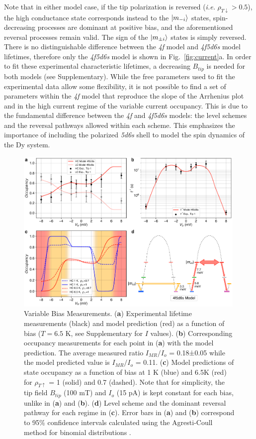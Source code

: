 \documentclass[
reprint,amsmath,amssymb,aps]{revtex4-2}
\begin{document}
Note that in either model case, if the tip polarization is reversed (\textit{i.e.} $\rho_{T \downarrow} > 0.5$), the high conductance state corresponds instead to the $\ket{m_{-i}}$ states, spin-decreasing processes are dominant at positive bias, and the aforementioned reversal processes remain valid. The sign of the $\ket{m_{\pm i}}$ states is simply reversed. There is no distinguishable difference between the \textit{4f} model and \textit{4f5d6s} model lifetimes, therefore only the \textit{4f5d6s} model is shown in Fig.~\ref{fig:current}a. In order to fit these experimental characteristic lifetimes, a decreasing $B_{tip}$ is needed for both models (see Supplementary). While the free parameters used to fit the experimental data allow some flexibility, it is not possible to find a set of parameters within the \textit{4f} model that reproduce the slope of the Arrhenius plot and in the high current regime of the variable current occupancy. This is due to the fundamental difference between the \textit{4f} and \textit{4f5d6s} models: the level schemes and the reversal pathways allowed within each scheme. This emphasizes the importance of including the polarized \textit{5d6s} shell to model the spin dynamics of the Dy system.

\begin{figure}[ht!]
\includegraphics[width=0.99\textwidth]{Fig4_new.pdf}
\caption{Variable Bias Measurements. (\textbf{a}) Experimental lifetime measurements (black) and model prediction (red) as a function of bias ($T = 6.5$ K, see Supplementary for $I$ values). (\textbf{b}) Corresponding occupancy measurements for each point in (\textbf{a}) with the model prediction. The average measured ratio $I_{MR}/I_{o}$ = 0.18±0.05 while the model predicted value is $I_{MR}/I_{o}$ = 0.11. (\textbf{c}) Model predictions of state occupancy as a function of bias at 1 K (blue) and 6.5K (red) for $\rho_{T \uparrow}$ = 1 (solid) and 0.7 (dashed). Note that for simplicity, the tip field $B_{tip}$ (100 mT) and $I_o$ (15 pA) is kept constant for each bias, unlike in (\textbf{a}) and (\textbf{b}). (\textbf{d}) Level scheme and the dominant reversal pathway for each regime in (\textbf{c}). Error bars in (\textbf{a}) and (\textbf{b}) correspond to 95$\%$ confidence intervals calculated using the Agresti-Coull method for binomial distributions \citep{agresti1998}.   
\label{fig:bias} }
\end{figure}
\end{document}
